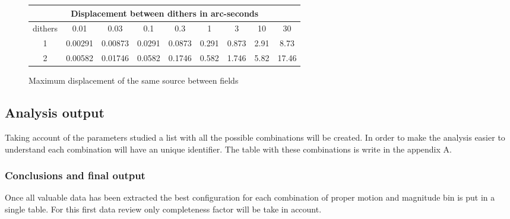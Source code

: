 \documentclass{article}
\begin{document}
\begin{figure}[H]
\centering
\begin{tabular}{|c|c|c|c|c|c|c|c|c|}
\hline
\multicolumn{9}{|c|}{Displacement between dithers in arc-seconds} \\
\hline \hline
dithers & 0.01 & 0.03 & 0.1 & 0.3 & 1 & 3 & 10 & 30\\
\hline \hline
1 & 0.00291 & 0.00873 & 0.0291  & 0.0873  & 0.291   & 0.873   & 2.91 & 8.73\\
\hline
2 & 0.00582 & 0.01746 & 0.0582  & 0.1746  & 0.582   & 1.746   & 5.82 & 17.46\\
\hline
\end{tabular}
\caption{Maximum displacement of the same source between fields}
\end{figure}

\subsection{Analysis output}
Taking account of the parameters studied a list with all the possible combinations will be created. In order to make the analysis easier to understand each combination will have an unique identifier. The table with these combinations is write in the appendix A.

\subsubsection{Conclusions and final output}
Once all valuable data has been extracted the best configuration for each combination of proper motion and magnitude bin is put in a single table. For this first data review only completeness factor will be take in account. 
\end{document}
